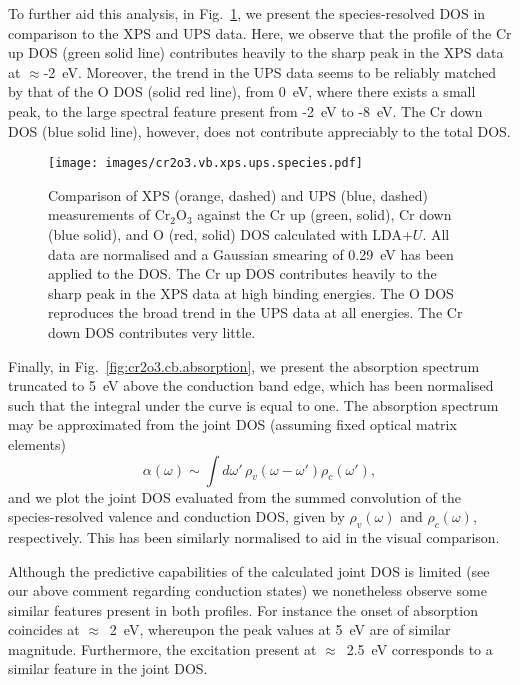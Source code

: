 To further aid this analysis, 
in Fig.~\ref{fig:cr2o3.vb.xps.ups.species}, 
we present the species-resolved DOS 
in comparison to the XPS and UPS data.
%
Here, we observe that the 
profile of the Cr up DOS (green solid line) 
contributes heavily to the sharp 
peak in the XPS data at $\approx$-2~eV.
%
Moreover, 
the trend in the UPS data 
seems to be reliably matched 
by that of the O DOS (solid red line), 
{from 0~eV}, 
where there exists a small peak, 
to the large spectral feature present 
from {-2~eV to -8~eV.}
%
The Cr down DOS (blue solid line), however, 
does not contribute appreciably to the total DOS.

\begin{figure}[th!]
\centering
\texttt{[image: images/cr2o3.vb.xps.ups.species.pdf]}
\caption[Normalised XPS and UPS measurements of Cr$_2$O$_3$ 
compared to LDA+$U$ species-resolved DOS]
{Comparison of 
XPS (orange, dashed) and UPS (blue, dashed) 
measurements of Cr$_2$O$_3$
against the 
Cr up (green, solid), 
Cr down (blue solid), 
and O (red, solid) 
DOS calculated with LDA+$U$.
%
All data are normalised and 
a Gaussian smearing of 0.29~eV 
has been applied to the DOS.
%
The Cr up DOS contributes heavily to the sharp 
peak in the XPS data at high binding energies.
%
The O DOS reproduces the broad trend 
in the UPS data at all energies.
%
The Cr down DOS contributes very little.
}
\label{fig:cr2o3.vb.xps.ups.species}
\end{figure}

{
Finally, 
in Fig.~\ref{fig:cr2o3.cb.absorption}, 
we present the absorption spectrum 
truncated to 5~eV above the conduction band edge, 
which has been normalised 
such that the integral under the curve is equal to one.
%
The absorption spectrum 
may be approximated from the joint DOS 
(assuming fixed optical matrix elements)
%
\begin{equation}
\alpha(\omega)\sim \int d\omega'\,\rho_v(\omega-\omega')\rho_c(\omega'), 
\end{equation}
%
and we plot the joint DOS 
evaluated from the summed 
convolution of the species-resolved 
valence and conduction DOS, 
given by $\rho_v(\omega)$ and $\rho_c(\omega)$, respectively.
%
This has been similarly normalised 
to aid in the visual comparison.}

{
Although the predictive capabilities 
of the calculated joint DOS is limited 
(see our above comment regarding 
conduction states)
we nonetheless observe some similar features 
present in both profiles.
%
For instance the onset of absorption 
coincides at $\approx$~2~eV, 
whereupon the peak values at 5~eV 
are of similar magnitude.
%
Furthermore, 
the excitation present at $\approx$~2.5~eV 
corresponds to a similar feature 
in the joint DOS.
}

